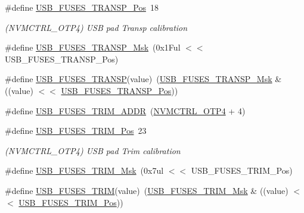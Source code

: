 \begin{DoxyCompactItemize}
\item 
\#define \mbox{\hyperlink{group__fuses__api_gaa2619428e9443f013405e7411b2f36ec}{U\+S\+B\+\_\+\+F\+U\+S\+E\+S\+\_\+\+T\+R\+A\+N\+S\+P\+\_\+\+Pos}}~18
\begin{DoxyCompactList}\small\item\em (N\+V\+M\+C\+T\+R\+L\+\_\+\+O\+T\+P4) U\+SB pad Transp calibration \end{DoxyCompactList}\item 
\#define \mbox{\hyperlink{group__fuses__api_gac808c85c705c2227ffe3c6e7f864935e}{U\+S\+B\+\_\+\+F\+U\+S\+E\+S\+\_\+\+T\+R\+A\+N\+S\+P\+\_\+\+Msk}}~(0x1\+Ful $<$$<$ U\+S\+B\+\_\+\+F\+U\+S\+E\+S\+\_\+\+T\+R\+A\+N\+S\+P\+\_\+\+Pos)
\item 
\#define \mbox{\hyperlink{group__fuses__api_ga775fc7aa8cd8a6c499b00c70bff4691c}{U\+S\+B\+\_\+\+F\+U\+S\+E\+S\+\_\+\+T\+R\+A\+N\+SP}}(value)~(\mbox{\hyperlink{group__fuses__api_gac808c85c705c2227ffe3c6e7f864935e}{U\+S\+B\+\_\+\+F\+U\+S\+E\+S\+\_\+\+T\+R\+A\+N\+S\+P\+\_\+\+Msk}} \& ((value) $<$$<$ \mbox{\hyperlink{group__fuses__api_gaa2619428e9443f013405e7411b2f36ec}{U\+S\+B\+\_\+\+F\+U\+S\+E\+S\+\_\+\+T\+R\+A\+N\+S\+P\+\_\+\+Pos}}))
\item 
\#define \mbox{\hyperlink{group__fuses__api_ga7c84bdced75dfd1ff6fcbdb7fe93071c}{U\+S\+B\+\_\+\+F\+U\+S\+E\+S\+\_\+\+T\+R\+I\+M\+\_\+\+A\+D\+DR}}~(\mbox{\hyperlink{group___s_a_m_d21_j18_a__base_ga138b4aca5a0446a745fe143c1dca8165}{N\+V\+M\+C\+T\+R\+L\+\_\+\+O\+T\+P4}} + 4)
\item 
\#define \mbox{\hyperlink{group__fuses__api_ga699a137d838370a9163b858b8eecccaf}{U\+S\+B\+\_\+\+F\+U\+S\+E\+S\+\_\+\+T\+R\+I\+M\+\_\+\+Pos}}~23
\begin{DoxyCompactList}\small\item\em (N\+V\+M\+C\+T\+R\+L\+\_\+\+O\+T\+P4) U\+SB pad Trim calibration \end{DoxyCompactList}\item 
\#define \mbox{\hyperlink{group__fuses__api_ga8f7ad76b603288c4e9af162a61db34be}{U\+S\+B\+\_\+\+F\+U\+S\+E\+S\+\_\+\+T\+R\+I\+M\+\_\+\+Msk}}~(0x7ul $<$$<$ U\+S\+B\+\_\+\+F\+U\+S\+E\+S\+\_\+\+T\+R\+I\+M\+\_\+\+Pos)
\item 
\#define \mbox{\hyperlink{group__fuses__api_ga8089214b3930d329e6dee1270f478fb5}{U\+S\+B\+\_\+\+F\+U\+S\+E\+S\+\_\+\+T\+R\+IM}}(value)~(\mbox{\hyperlink{group__fuses__api_ga8f7ad76b603288c4e9af162a61db34be}{U\+S\+B\+\_\+\+F\+U\+S\+E\+S\+\_\+\+T\+R\+I\+M\+\_\+\+Msk}} \& ((value) $<$$<$ \mbox{\hyperlink{group__fuses__api_ga699a137d838370a9163b858b8eecccaf}{U\+S\+B\+\_\+\+F\+U\+S\+E\+S\+\_\+\+T\+R\+I\+M\+\_\+\+Pos}}))

\end{DoxyCompactItemize}
